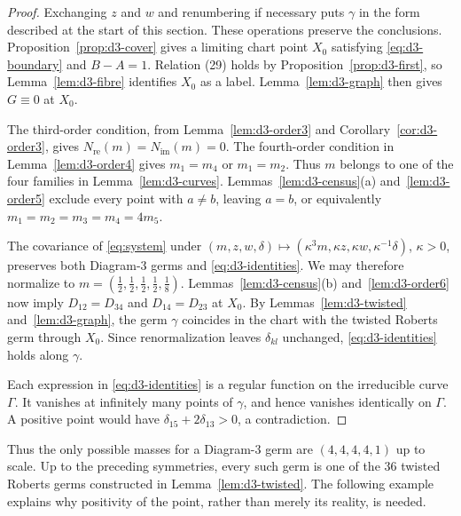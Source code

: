 \documentclass[11pt]{amsart}
\theoremstyle{definition}
\theoremstyle{remark}
\begin{document}
\begin{proof}
{Exchanging $z$ and $w$ and renumbering if necessary puts $\gamma$ in the form
described at the start of this section. These operations preserve the conclusions.
Proposition~\ref{prop:d3-cover} gives a limiting chart point $X_0$ satisfying
\eqref{eq:d3-boundary} and $B-A=1$. Relation (29) holds by Proposition~\ref{prop:d3-first},
so Lemma~\ref{lem:d3-fibre} identifies $X_0$ as a label. Lemma~\ref{lem:d3-graph} then gives
$G\equiv0$ at $X_0$.

The third-order condition, from Lemma~\ref{lem:d3-order3} and
Corollary~\ref{cor:d3-order3}, gives $N_{\mathrm{re}}(m)=N_{\mathrm{im}}(m)=0$.
The fourth-order condition in Lemma~\ref{lem:d3-order4} gives $m_1=m_4$ or $m_1=m_2$.
Thus $m$ belongs to one of the four families in Lemma~\ref{lem:d3-curves}.
Lemmas~\ref{lem:d3-census}(a) and~\ref{lem:d3-order5} exclude every point with $a\ne b$,
leaving $a=b$, or equivalently $m_1=m_2=m_3=m_4=4m_5$.

The covariance of \eqref{eq:system} under
$(m,z,w,\delta)\mapsto(\kappa^3m,\kappa z,\kappa w,\kappa^{-1}\delta)$, $\kappa>0$,
preserves both Diagram-3 germs and \eqref{eq:d3-identities}.
We may therefore normalize to $m=(\frac12,\frac12,\frac12,\frac12,\frac18)$.
Lemmas~\ref{lem:d3-census}(b) and~\ref{lem:d3-order6} now imply $D_{12}=D_{34}$ and
$D_{14}=D_{23}$ at $X_0$.
By Lemmas~\ref{lem:d3-twisted} and~\ref{lem:d3-graph}, the germ $\gamma$ coincides in the chart
with the twisted Roberts germ through $X_0$. Since renormalization leaves $\delta_{kl}$ unchanged,
\eqref{eq:d3-identities} holds along $\gamma$.

Each expression in \eqref{eq:d3-identities} is a regular function on the irreducible curve
$\Gamma$. It vanishes at infinitely many points of $\gamma$, and hence vanishes identically
on $\Gamma$. A positive point would have $\delta_{15}+2\delta_{13}>0$, a contradiction.}
\end{proof}

{Thus the only possible masses for a Diagram-3 germ are $(4,4,4,4,1)$ up to scale.
Up to the preceding symmetries, every such germ is one of the $36$ twisted Roberts germs
constructed in Lemma~\ref{lem:d3-twisted}. The following example explains why positivity
of the point, rather than merely its reality, is needed.}
\end{document}
